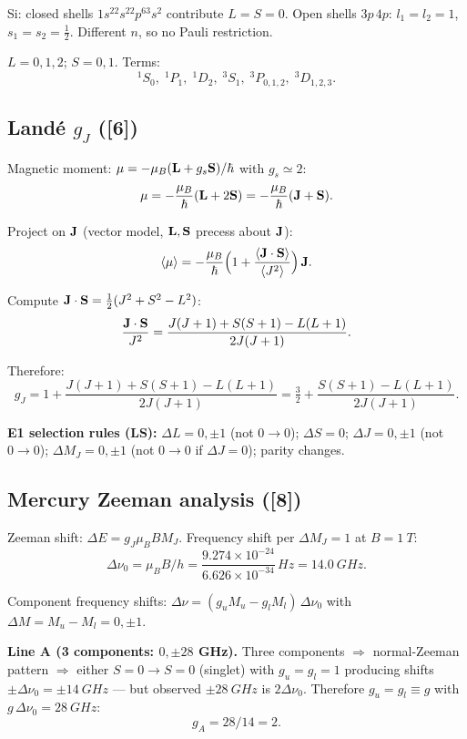\documentclass[11pt]{article}
\begin{document}
Si: closed shells $1s^22s^22p^63s^2$ contribute $L=S=0$. Open shells $3p\,4p$:
$l_1=l_2=1$, $s_1=s_2=\tfrac12$. Different $n$, so no Pauli restriction.

$L = 0,1,2$; $S=0,1$. Terms:
\[
\boxed{\;{}^1S_0,\;{}^1P_1,\;{}^1D_2,\;{}^3S_1,\;{}^3P_{0,1,2},\;{}^3D_{1,2,3}.\;}
\]

\subsection*{Land\'e $g_J$ ([6])}

Magnetic moment: $\vb\mu = -\mu_B(\vb L+g_s\vb S)/\hbar$ with $g_s\simeq 2$:
\[
\vb\mu = -\frac{\mu_B}{\hbar}(\vb L + 2\vb S) = -\frac{\mu_B}{\hbar}(\vb J + \vb S).
\]

Project on $\vb J$ (vector model, $\vb L,\vb S$ precess about $\vb J$):
\[
\langle\vb\mu\rangle = -\frac{\mu_B}{\hbar}\Bigl(1 + \frac{\langle\vb J\cdot\vb S\rangle}{\langle J^2\rangle}\Bigr)\,\vb J.
\]

Compute $\vb J\cdot\vb S = \tfrac12(J^2+S^2-L^2)$:
\[
\frac{\vb J\cdot\vb S}{J^2} = \frac{J(J+1)+S(S+1)-L(L+1)}{2J(J+1)}.
\]

Therefore:
\[
\boxed{\;g_J = 1 + \frac{J(J+1)+S(S+1)-L(L+1)}{2J(J+1)} = \tfrac{3}{2} + \frac{S(S+1)-L(L+1)}{2J(J+1)}.\;}
\]

\textbf{E1 selection rules (LS):}
$\Delta L = 0,\pm 1$ (not $0\to 0$); $\Delta S = 0$;
$\Delta J = 0,\pm 1$ (not $0\to 0$); $\Delta M_J = 0,\pm 1$ (not $0\to 0$ if $\Delta J=0$);
parity changes.

\subsection*{Mercury Zeeman analysis ([8])}

Zeeman shift: $\Delta E = g_J\mu_B B M_J$. Frequency shift per $\Delta M_J = 1$ at
$B=\SI{1}{T}$:
\[
\Delta\nu_0 = \mu_B B/h = \frac{9.274\times 10^{-24}}{6.626\times 10^{-34}}\,\si{Hz} = \SI{14.0}{GHz}.
\]

Component frequency shifts: $\Delta\nu = (g_u M_u - g_l M_l)\,\Delta\nu_0$
with $\Delta M = M_u - M_l = 0,\pm 1$.

\textbf{Line A (3 components: $0,\pm 28$ GHz).} Three components $\Rightarrow$
normal-Zeeman pattern $\Rightarrow$ either $S=0\to S=0$ (singlet) with $g_u=g_l=1$
producing shifts $\pm\Delta\nu_0=\pm\SI{14}{GHz}$ --- but observed $\pm\SI{28}{GHz}$
is $2\Delta\nu_0$. Therefore $g_u = g_l \equiv g$ with $g\,\Delta\nu_0 = \SI{28}{GHz}$:
\[
g_A = 28/14 = 2.
\]
\end{document}
